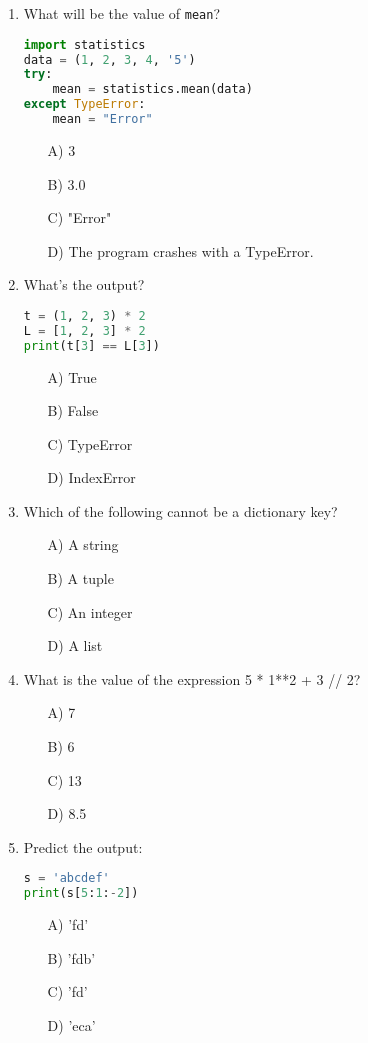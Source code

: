 \documentclass[9pt]{article}
\begin{document}
\begin{multicols}{2}
\begin{enumerate}
\item What will be the value of \texttt{mean}?
\begin{lstlisting}[language=Python]
import statistics
data = (1, 2, 3, 4, '5')
try:
    mean = statistics.mean(data)
except TypeError:
    mean = "Error"
\end{lstlisting}
\begin{enumerate}
\item[A)] 3
\item[B)] 3.0
\item[C)] "Error"
\item[D)] The program crashes with a TypeError.
\end{enumerate}

\item What's the output?
\begin{lstlisting}[language=Python]
t = (1, 2, 3) * 2
L = [1, 2, 3] * 2
print(t[3] == L[3])
\end{lstlisting}
\begin{enumerate}
\item[A)] True
\item[B)] False
\item[C)] TypeError
\item[D)] IndexError
\end{enumerate}

\item Which of the following cannot be a dictionary key?
\begin{enumerate}
    \item[A)] A string
    \item[B)] A tuple
    \item[C)] An integer
    \item[D)] A list
\end{enumerate}

\item What is the value of the expression 5 * 1**2 + 3 // 2?
\begin{enumerate}
\item[A)] 7
\item[B)] 6
\item[C)] 13
\item[D)] 8.5
\end{enumerate}

\item Predict the output:
\begin{lstlisting}[language=Python]
s = 'abcdef'
print(s[5:1:-2])
\end{lstlisting}
\begin{enumerate}
\item[A)] 'fd'
\item[B)] 'fdb'
\item[C)] 'fd'
\item[D)] 'eca'
\end{enumerate}


\end{enumerate}
\end{multicols}
\end{document}
